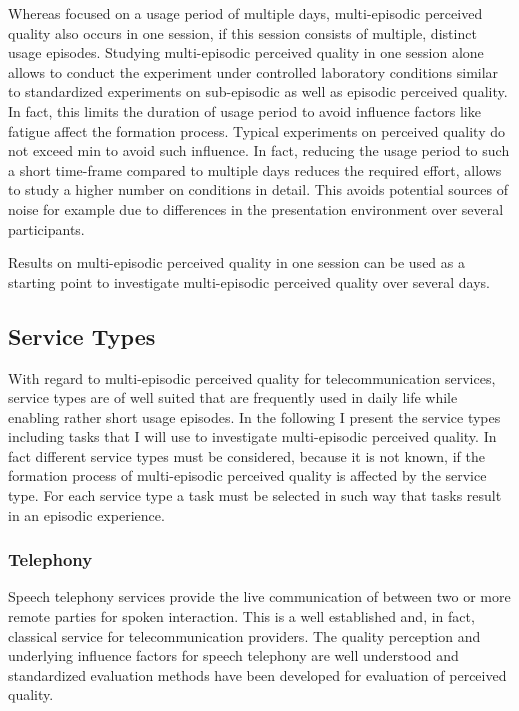 Whereas \citet{moller_single-call_2011} focused on a usage period of multiple days, multi-episodic perceived quality also occurs in one session, if this session consists of multiple, distinct usage episodes.
Studying multi-episodic perceived quality in one session alone allows to conduct the experiment under controlled laboratory conditions similar to standardized experiments on sub-episodic as well as episodic perceived quality.
In fact, this limits the duration of usage period to avoid influence factors like fatigue affect the formation process.
Typical experiments on perceived quality do not exceed \unit[90]{min} to avoid such influence.
In fact, reducing the usage period to such a short time-frame compared to multiple days reduces the required effort, allows to study a higher number on conditions in detail.
This avoids potential sources of noise for example due to differences in the presentation environment over several participants.

Results on multi-episodic perceived quality in one session can be used as a starting point to investigate multi-episodic perceived quality over several days.

\subsection{Service Types}
With regard to multi-episodic perceived quality for telecommunication services, service types are of well suited that are frequently used in daily life while enabling rather short usage episodes.
In the following I present the service types including tasks that I will use to investigate multi-episodic perceived quality.
In fact different service types must be considered, because it is not known, if the formation process of multi-episodic perceived quality is affected by the service type.
For each service type a task must be selected in such way that tasks result in an episodic experience.

\subsubsection*{Telephony}\label{method:sct}
Speech telephony services provide the live communication of between two or more remote parties for spoken interaction.
This is a well established and, in fact, classical service for telecommunication providers.
The quality perception and underlying influence factors for speech telephony are well understood and standardized evaluation methods have been developed for evaluation of perceived quality.

